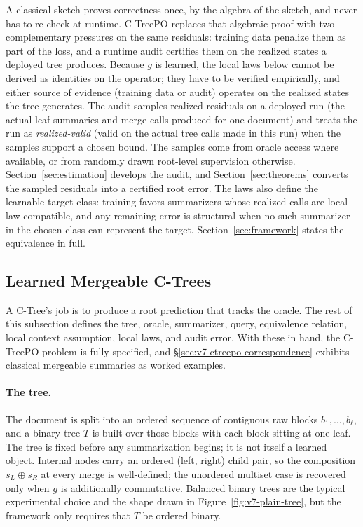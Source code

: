 A classical sketch proves correctness once, by the algebra of the
sketch, and never has to re-check at runtime. C-TreePO replaces that
algebraic proof with two complementary pressures on the same
residuals: training data penalize them as part of the loss, and a
runtime audit certifies them on the realized states a deployed tree
produces. Because \(g\) is learned, the local laws below cannot be
derived as identities on the operator; they have to be verified
empirically, and either source of evidence (training data or audit)
operates on the realized states the tree generates. The audit samples
realized residuals on a deployed run (the actual leaf summaries and
merge calls produced for one document) and treats the run as
\emph{realized-valid} (valid on the actual tree calls made in this run)
when the samples support a chosen bound. The
samples come from oracle access where available, or from randomly
drawn root-level supervision otherwise.
Section~\ref{sec:estimation} develops the audit, and
Section~\ref{sec:theorems} converts the sampled residuals into a
certified root error. The laws also define the learnable target class:
training favors summarizers whose realized calls are local-law
compatible, and any remaining error is structural when no such
summarizer in the chosen class can represent the target.
Section~\ref{sec:framework} states the equivalence in full.

\subsection{Learned Mergeable C-Trees}
\label{sec:v7-ctreepo-state-machine}

A C-Tree's job is to produce a root prediction that tracks the
oracle. The rest of this subsection defines the tree, oracle,
summarizer, query, equivalence relation, local context assumption,
local laws, and audit error. With these in hand, the C-TreePO problem
is fully specified, and \S\ref{sec:v7-ctreepo-correspondence}
exhibits classical mergeable summaries as worked examples.

\paragraph{The tree.}
The document is split into an ordered sequence of contiguous raw
blocks \(b_1,\dots,b_\ell\), and a binary tree \(T\) is built over
those blocks with each block sitting at one leaf. The tree is fixed
before any summarization begins; it is not itself a learned object.
Internal nodes carry an ordered (left, right) child pair, so the
composition \(s_L\oplus s_R\) at every merge is well-defined; the
unordered multiset case is recovered only when \(g\) is additionally
commutative. Balanced binary trees are the typical experimental
choice and the shape drawn in Figure~\ref{fig:v7-plain-tree}, but
the framework only requires that \(T\) be ordered binary.

